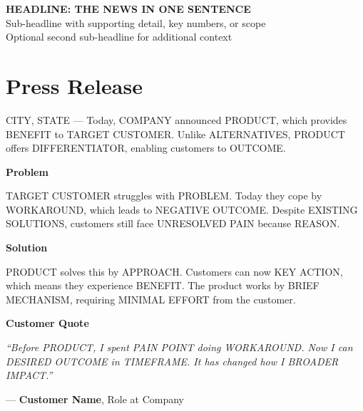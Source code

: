 \documentclass[11pt,letterpaper]{article}
\newcommand{\prsection}[1]{%
  \vspace{1em}%
  {\large\bfseries\color{SectionBlue}#1}%
  \vspace{0.3em}\par%
}
\begin{document}
\begin{center}
  {\LARGE\bfseries\color{SectionBlue} HEADLINE: THE NEWS IN ONE SENTENCE} \\[0.8em]
  {\large\color{AccentGray} Sub-headline with supporting detail, key numbers, or scope} \\[0.3em]
  {\large\color{AccentGray} Optional second sub-headline for additional context}
\end{center}

\vspace{0.5em}


\section*{Press Release}

CITY, STATE --- Today, COMPANY announced PRODUCT, which provides BENEFIT
to TARGET CUSTOMER. Unlike ALTERNATIVES, PRODUCT offers DIFFERENTIATOR,
enabling customers to OUTCOME.

\prsection{Problem}

TARGET CUSTOMER struggles with PROBLEM. Today they cope by WORKAROUND,
which leads to NEGATIVE OUTCOME. Despite EXISTING SOLUTIONS, customers
still face UNRESOLVED PAIN because REASON.

\prsection{Solution}

PRODUCT solves this by APPROACH. Customers can now KEY ACTION, which means
they experience BENEFIT. The product works by BRIEF MECHANISM, requiring
MINIMAL EFFORT from the customer.

\prsection{Customer Quote}

\begin{customerquote}
\textit{``Before PRODUCT, I spent PAIN POINT doing WORKAROUND. Now I can
DESIRED OUTCOME in TIMEFRAME. It has changed how I BROADER IMPACT.''}

\raggedleft --- \textbf{Customer Name}, Role at Company
\end{customerquote}
\end{document}
